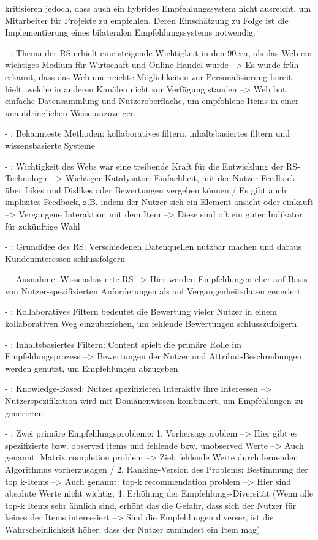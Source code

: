 \textcite[S. 1]{malinowski:2008} kritisieren jedoch, dass auch ein hybrides Empfehlungssystem nicht ausreicht, um Mitarbeiter für Projekte zu empfehlen. Deren Einschätzung zu Folge ist die Implementierung eines bilateralen Empfehlungssystems notwendig.

\newpage
- \cite[S. xvii]{recommenderSystems:2016}: Thema der RS erhielt eine steigende Wichtigkeit in den 90ern, als das Web ein wichtiges Medium für Wirtschaft und Online-Handel wurde --> Es wurde früh erkannt, dass das Web unerreichte Möglichkeiten zur Personalisierung bereit hielt, welche in anderen Kanälen nicht zur Verfügung standen --> Web bot einfache Datensammlung und Nutzeroberfläche, um empfohlene Items in einer unaufdringlichen Weise anzuzeigen

- \cite[S. xvii]{recommenderSystems:2016}: Bekannteste Methoden: kollaboratives filtern, inhaltsbasiertes filtern und wissensbasierte Systeme

- \cite[S. 1]{recommenderSystems:2016}: Wichtigkeit des Webs war eine treibende Kraft für die Entwicklung der RS-Technologie --> Wichtiger Katalysator: Einfachheit, mit der Nutzer Feedback über Likes und Dislikes oder Bewertungen vergeben können / Es gibt auch implizites Feedback, z.B. indem der Nutzer sich ein Element ansieht oder einkauft --> Vergangene Interaktion mit dem Item --> Diese sind oft ein guter Indikator für zukünftige Wahl

- \cite[S. 1]{recommenderSystems:2016}: Grundidee des RS: Verschiedenen Datenquellen nutzbar machen und daraus Kundeninteressen schlussfolgern

- \cite[S. 1f.]{recommenderSystems:2016}: Ausnahme: Wissensbasierte RS --> Hier werden Empfehlungen eher auf Basis von Nutzer-spezifizierten Anforderungen als auf Vergangenheitsdaten generiert

- \cite[S. 2]{recommenderSystems:2016}: Kollaboratives Filtern bedeutet die Bewertung vieler Nutzer in einem kollaborativen Weg einzubeziehen, um fehlende Bewertungen schlusszufolgern

- \cite[S. 2]{recommenderSystems:2016}: Inhaltsbasiertes Filtern: Content spielt die primäre Rolle im Empfehlungsprozess --> Bewertungen der Nutzer und Attribut-Beschreibungen werden genutzt, um Empfehlungen abzugeben

- \cite[S. 2]{recommenderSystems:2016}: Knowledge-Based: Nutzer spezifizieren Interaktiv ihre Interessen --> Nutzerspezifikation wird mit Domänenwissen kombiniert, um Empfehlungen zu generieren

- \cite[S. 3]{recommenderSystems:2016}: Zwei primäre Empfehlungsprobleme: 1. Vorhersageproblem --> Hier gibt es spezifizierte bzw. observed items und fehlende bzw. unobserved Werte --> Auch genannt: Matrix completion problem --> Ziel: fehlende Werte durch lernenden Algorithmus vorherzusagen / 2. Ranking-Version des Problems: Bestimmung der top k-Items --> Auch genannt: top-k recommendation problem --> Hier sind absolute Werte nicht wichtig; 4. Erhöhung der Empfehlungs-Diversität (Wenn alle top-k Items sehr ähnlich sind, erhöht das die Gefahr, dass sich der Nutzer für keines der Items interessiert --> Sind die Empfehlungen diverser, ist die Wahrscheinlichkeit höher, dass der Nutzer zumindest ein Item mag)

